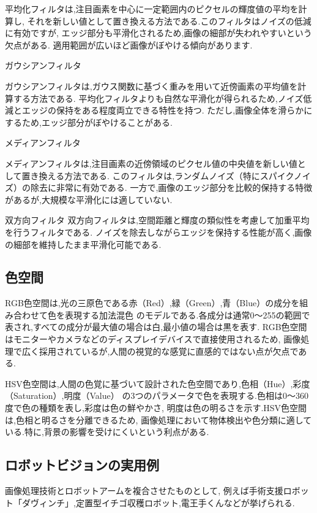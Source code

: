 平均化フィルタは,注目画素を中心に一定範囲内のピクセルの輝度値の平均を計算し,
それを新しい値として置き換える方法である.このフィルタはノイズの低減に有効ですが,
エッジ部分も平滑化されるため,画像の細部が失われやすいという欠点がある.
適用範囲が広いほど画像がぼやける傾向があります.

ガウシアンフィルタ

ガウシアンフィルタは,ガウス関数に基づく重みを用いて近傍画素の平均値を計算する方法である.
平均化フィルタよりも自然な平滑化が得られるため,ノイズ低減とエッジの保持をある程度両立できる特性を持つ.
ただし,画像全体を滑らかにするため,エッジ部分がぼやけることがある.

メディアンフィルタ

メディアンフィルタは,注目画素の近傍領域のピクセル値の中央値を新しい値として置き換える方法である.
このフィルタは,ランダムノイズ（特にスパイクノイズ）の除去に非常に有効である.
一方で,画像のエッジ部分を比較的保持する特徴があるが,大規模な平滑化には適していない.

双方向フィルタ
双方向フィルタは,空間距離と輝度の類似性を考慮して加重平均を行うフィルタである.
ノイズを除去しながらエッジを保持する性能が高く,画像の細部を維持したまま平滑化可能である.

\subsection{色空間}
RGB色空間は,光の三原色である赤（Red）,緑（Green）,青（Blue）の成分を組み合わせて色を表現する加法混色
のモデルである.各成分は通常0～255の範囲で表され,すべての成分が最大値の場合は白,最小値の場合は黒を表す.
RGB色空間はモニターやカメラなどのディスプレイデバイスで直接使用されるため,
画像処理で広く採用されているが,人間の視覚的な感覚に直感的ではない点が欠点である.

HSV色空間は,人間の色覚に基づいて設計された色空間であり,色相（Hue）,彩度（Saturation）,明度（Value）
の3つのパラメータで色を表現する.色相は0～360度で色の種類を表し,彩度は色の鮮やかさ,
明度は色の明るさを示す.HSV色空間は,色相と明るさを分離できるため,
画像処理において物体検出や色分類に適している.特に,背景の影響を受けにくいという利点がある.

\subsection{ロボットビジョンの実用例}
画像処理技術とロボットアームを複合させたものとして,
例えば手術支援ロボット「ダヴィンチ」,定置型イチゴ収穫ロボット,電王手くんなどが挙げられる.

